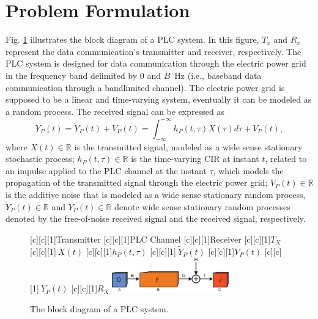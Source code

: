 \documentclass[journal]{IEEEtran}
\begin{document}
\section{Problem Formulation}

Fig. \ref{PLCchannel} illustrates the block diagram of a \ac{PLC} system. In this figure, $T_x$ and $R_x$ represent the data communication's transmitter and receiver, respectively. The \ac{PLC} system is designed for data communication through the electric power grid in the frequency band delimited by $0$ and $B$~Hz (i.e., baseband data communication through a bandlimited channel). The electric power grid is supposed to be a linear and time-varying system, eventually it can be modeled as a random process. The received signal can be expressed as
\begin{equation} \label{received signal}
Y_P(t) = \tilde{Y}_P(t)+V_P(t) = \int_{-\infty}^{+\infty} h_P(t,\tau) X(\tau) d\tau + V_P(t),
\end{equation}
where $X(t)\in \mathbb{R}$ is the transmitted signal, modeled as a wide sense stationary stochastic process; $h_P(t,\tau)\in \mathbb{R}$ is the time-varying \ac{CIR} at instant $t$, related to an impulse applied to the \ac{PLC} channel at the instant $\tau$, which models the propagation of the transmitted signal through the electric power grid; $V_P(t)\in \mathbb{R}$ is the additive noise that is modeled as a wide sense stationary random process, $\tilde{Y}_P(t)\in \mathbb{R}$ and $Y_P(t)\in \mathbb{R}$ denote wide sense stationary random processes denoted by the free-of-noise received signal and the received signal, respectively.

\begin{figure}[h]
	\centering
	[c][1]{Transmitter}
	[c][1]{PLC Channel}
	[c][1]{Receiver}
	[c][1]{$T_X$}
	[c][1]{$~X(t)$}
	[c][1]{$h_P(t,\tau)$}
	[c][1]{$~\tilde{Y}_P(t)$}
	[c][1]{$V_P(t)$}
	[c][1]{$~Y_P(t)$}
	[c][1]{$R_X$}
	\includegraphics[width=0.45\textwidth]{images/PLCchannel.eps}
	\caption{The block diagram of a PLC system.}
	\label{PLCchannel}
\end{figure}
\end{document}
